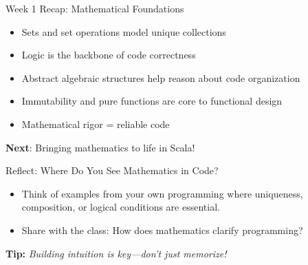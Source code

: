 \documentclass{beamer}
\newcommand{\tip}[1]{\vspace{0.5em}\textbf{Tip:} \textit{#1}}
\begin{document}
\begin{frame}{Week 1 Recap: Mathematical Foundations}
\begin{itemize}
    \item Sets and set operations model unique collections
    \item Logic is the backbone of code correctness
    \item Abstract algebraic structures help reason about code organization
    \item Immutability and pure functions are core to functional design
    \item Mathematical rigor = reliable code
\end{itemize}

\textbf{Next}: Bringing mathematics to life in Scala!
\end{frame}

\begin{frame}{Reflect: Where Do You See Mathematics in Code?}
\begin{itemize}
    \item Think of examples from your own programming where uniqueness, composition, or logical conditions are essential.
    \item Share with the class: How does mathematics clarify programming?
\end{itemize}

\tip{Building intuition is key—don't just memorize!}
\end{frame}
\end{document}
